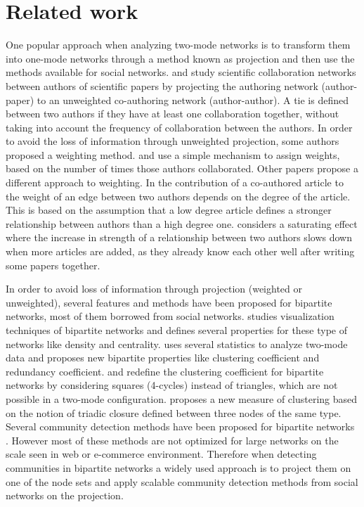 
\section{Related work}

One popular approach when analyzing two-mode networks is to transform them into
one-mode networks through a method known as projection and then use the methods
available for social networks. \citet{newman2001scientific1} and
\citet{barabasi2002evolution} study scientific collaboration networks between
authors of scientific papers by projecting the authoring network (author-paper)
to an unweighted co-authoring network (author-author). A tie is defined between
two authors if they have at least one collaboration together, without taking
into account the frequency of collaboration between the authors. In order to
avoid the loss of information through unweighted projection, some authors
proposed a weighting method. \citet{ramasco2006social} and
\citet{li2007evolving} use a simple mechanism to assign weights, based on the
number of times those authors collaborated. Other papers propose a different
approach to weighting. In \citet{newman2001scientific2} the contribution of a
co-authored article to the weight of an edge between two authors depends on the
degree of the article. This is based on the assumption that a low degree article
defines a stronger relationship between authors than a high degree one.
\citet{li2005weighted} considers a saturating effect where the increase in
strength of a relationship between two authors slows down when more articles
are added, as they already know each other well after writing some papers
together.

In order to avoid loss of information through projection (weighted or
unweighted), several features and methods have been proposed for bipartite
networks, most of them borrowed from social networks.
\citet{borgatti1997network} studies visualization techniques of bipartite
networks and defines several properties for these type of networks like density
and centrality. \citet{latapy2008basic} uses several statistics to analyze
two-mode data and proposes new bipartite properties like clustering coefficient
and redundancy coefficient. \citet{lind2005cycles} and
\citet{zhang2008clustering} redefine the clustering coefficient for bipartite
networks by considering squares (4-cycles) instead of triangles, which are not
possible in a two-mode configuration. \citet{opsahl2011triadic} proposes a new
measure of clustering based on the notion of triadic closure defined between
three nodes of the same type. Several community detection methods have been
proposed for bipartite networks \citep{fortunato2010community}. However most of
these methods are not optimized for large networks on the scale seen in web or
e-commerce environment. Therefore when detecting communities in bipartite
networks a widely used approach is to project them on one of the node sets and
apply scalable community detection methods from social networks on the
projection.

